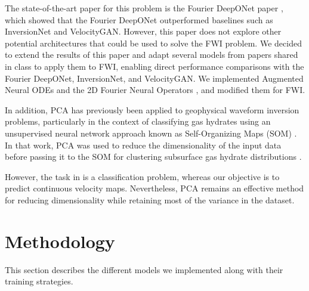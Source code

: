 \documentclass{article}
\newcommand{\instructions}[1]{{\color{blue} #1}}
\begin{document}
The state-of-the-art paper for this problem is the Fourier DeepONet paper \cite{fdonet}, which showed that the Fourier DeepONet outperformed baselines such as InversionNet and VelocityGAN. However, this paper does not explore other potential architectures that could be used to solve the FWI problem. We decided to extend the results of this paper and adapt several models from papers shared in class to apply them to FWI, enabling direct performance comparisons with the Fourier DeepONet, InversionNet, and VelocityGAN. We implemented Augmented Neural ODEs \cite{anode} and the 2D Fourier Neural Operators \cite{fno}, and modified them for FWI.

In addition, PCA has previously been applied to geophysical waveform inversion problems, particularly in the context of classifying gas hydrates using an unsupervised neural network approach known as Self-Organizing Maps (SOM) \cite{jones2023waveform} . In that work, PCA was used to reduce the dimensionality of the input data before passing it to the SOM for clustering subsurface gas hydrate distributions \cite{jones2023waveform}. %



However, the task in \cite{jones2023waveform} is a classification problem, whereas our objective is to predict continuous velocity maps. Nevertheless, PCA remains an effective method for reducing dimensionality while retaining most of the variance in the dataset.

\section{Methodology}

This section describes the different models we implemented along with their training strategies.
\end{document}
